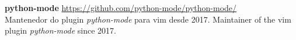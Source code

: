 \documentclass[]{friggeri-cv}
\begin{document}
\begin{entrylist}
\end{entrylist}%
%
%
\textbf{python-mode} \hfill \small{\href{https://github.com/python-mode/python-mode}{https://github.com/python-mode/python-mode/}}\\
\small{%
{Mantenedor do plugin \emph{python-mode} para vim desde 2017.}%
{Maintainer of the vim plugin \emph{python-mode} since 2017.}}\\
\end{document}
